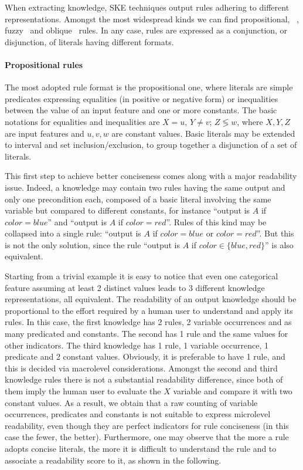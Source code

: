 \documentclass[sigconf]{acmart}
\begin{document}
When extracting knowledge, SKE techniques output rules adhering to different representations.
%
Amongst the most widespread kinds we can find propositional, \mofn{}~\cite{TowellS91,murphy1991id2}, fuzzy~\cite{HorikawaFU92,Berenji91} and oblique~\cite{Setiono00,SetionoL97} rules.
%
In any case, rules are expressed as a conjunction, or disjunction, of literals having different formats.

\paragraph{Propositional rules}

The most adopted rule format is the propositional one, where literals are simple predicates expressing equalities (in positive or negative form) or inequalities between the value of an input feature and one or more constants.
%
The basic notations for equalities and inequalities are $X = u$, $Y \neq v$; $Z \lessgtr w$, where $X,Y,Z$ are input features and $u,v,w$ are constant values.
%
Basic literals may be extended to interval and set inclusion/exclusion, to group together a disjunction of a set of literals.

This first step to achieve better conciseness comes along with a major readability issue.
%
Indeed, a knowledge may contain two rules having the same output and only one precondition each, composed of a basic literal involving the same variable but compared to different constants, for instance ``output is $A$ if $color=blue$'' and ``output is $A$ if $color=red$''.
%
Rules of this kind may be collapsed into a single rule: ``output is $A$ if $color=blue$ or $color=red$''.
%
But this is not the only solution, since the rule ``output is $A$ if $color \in \{blue,red\}$'' is also equivalent.

Starting from a trivial example it is easy to notice that even one categorical feature assuming at least 2 distinct values leads to 3 different knowledge representations, all equivalent.
%
The readability of an output knowledge should be proportional to the effort required by a human user to understand and apply its rules.
%
In this case, the first knowledge has 2 rules, 2 variable occurrences and as many predicated and constants.
%
The second has 1 rule and the same values for other indicators.
%
The third knowledge has 1 rule, 1 variable occurrence, 1 predicate and 2 constant values.
%
Obviously, it is preferable to have 1 rule, and this is decided via macrolevel considerations.
%
Amongst the second and third knowledge rules there is not a substantial readability difference, since both of them imply the human user to evaluate the $X$ variable and compare it with two constant values.
%
As a result, we obtain that a raw counting of variable occurrences, predicates and constants is not suitable to express microlevel readability, even though they are perfect indicators for rule conciseness (in this case the fewer, the better).
%
Furthermore, one may observe that the more a rule adopts concise literals, the more it is difficult to understand the rule and to associate a readability score to it, as shown in the following.
\end{document}
